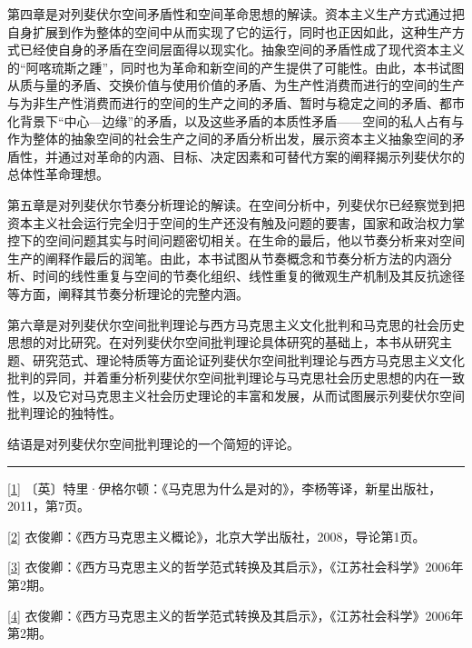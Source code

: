 \documentclass[UTF8, fontset = sourcesans, a4paper, oneside, zihao =
-4, scheme=chinese, no-math, space=true]{ctexbook}
\begin{document}
第四章是对列斐伏尔空间矛盾性和空间革命思想的解读。资本主义生产方式通过把自身扩展到作为整体的空间中从而实现了它的运行，同时也正因如此，这种生产方式已经使自身的矛盾在空间层面得以现实化。抽象空间的矛盾性成了现代资本主义的``阿喀琉斯之踵''，同时也为革命和新空间的产生提供了可能性。由此，本书试图从质与量的矛盾、交换价值与使用价值的矛盾、为生产性消费而进行的空间的生产与为非生产性消费而进行的空间的生产之间的矛盾、暂时与稳定之间的矛盾、都市化背景下``中心---边缘''的矛盾，以及这些矛盾的本质性矛盾------空间的私人占有与作为整体的抽象空间的社会生产之间的矛盾分析出发，展示资本主义抽象空间的矛盾性，并通过对革命的内涵、目标、决定因素和可替代方案的阐释揭示列斐伏尔的总体性革命理想。

第五章是对列斐伏尔节奏分析理论的解读。在空间分析中，列斐伏尔已经察觉到把资本主义社会运行完全归于空间的生产还没有触及问题的要害，国家和政治权力掌控下的空间问题其实与时间问题密切相关。在生命的最后，他以节奏分析来对空间生产的阐释作最后的润笔。由此，本书试图从节奏概念和节奏分析方法的内涵分析、时间的线性重复与空间的节奏化组织、线性重复的微观生产机制及其反抗途径等方面，阐释其节奏分析理论的完整内涵。

第六章是对列斐伏尔空间批判理论与西方马克思主义文化批判和马克思的社会历史思想的对比研究。在对列斐伏尔空间批判理论具体研究的基础上，本书从研究主题、研究范式、理论特质等方面论证列斐伏尔空间批判理论与西方马克思主义文化批判的异同，并着重分析列斐伏尔空间批判理论与马克思社会历史思想的内在一致性，以及它对马克思主义社会历史理论的丰富和发展，从而试图展示列斐伏尔空间批判理论的独特性。

结语是对列斐伏尔空间批判理论的一个简短的评论。

\begin{center}\rule{0.5\linewidth}{\linethickness}\end{center}

\protect\hypertarget{part0004.htmlux5cux23m1}{}{}\protect\hyperlink{part0004.htmlux5cux23w1}{{[}1{]}}
〔英〕特里·伊格尔顿：《马克思为什么是对的》，李杨等译，新星出版社，2011，第7页。

\protect\hypertarget{part0004.htmlux5cux23m2}{}{}\protect\hyperlink{part0004.htmlux5cux23w2}{{[}2{]}}
衣俊卿：《西方马克思主义概论》，北京大学出版社，2008，导论第1页。

\protect\hypertarget{part0004.htmlux5cux23m3}{}{}\protect\hyperlink{part0004.htmlux5cux23w3}{{[}3{]}}
衣俊卿：《西方马克思主义的哲学范式转换及其启示》，《江苏社会科学》2006年第2期。

\protect\hypertarget{part0004.htmlux5cux23m4}{}{}\protect\hyperlink{part0004.htmlux5cux23w4}{{[}4{]}}
衣俊卿：《西方马克思主义的哲学范式转换及其启示》，《江苏社会科学》2006年第2期。
\end{document}
